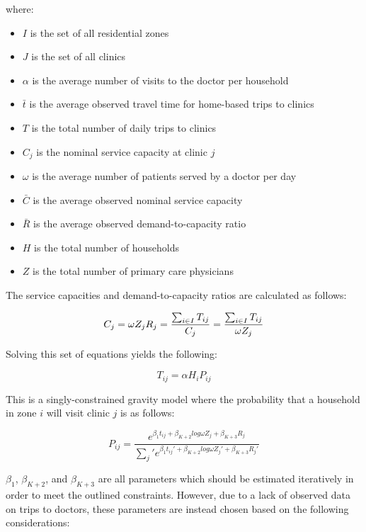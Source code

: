 \documentclass{article}
\begin{document}
where:

\begin{itemize}
\tightlist
\item
  \(I\) is the set of all residential zones
\item
  \(J\) is the set of all clinics
\item
  \(\alpha\) is the average number of visits to the doctor per household
\item
  \(\bar{t}\) is the average observed travel time for home-based trips
  to clinics
\item
  \(T\) is the total number of daily trips to clinics
\item
  \(C_j\) is the nominal service capacity at clinic \(j\)
\item
  \(\omega\) is the average number of patients served by a doctor per
  day
\item
  \(\bar{C}\) is the average observed nominal service capacity
\item
  \(\bar{R}\) is the average observed demand-to-capacity ratio
\item
  \(H\) is the total number of households
\item
  \(Z\) is the total number of primary care physicians
\end{itemize}

The service capacities and demand-to-capacity ratios are calculated as
follows:

\[
C_j = \omega Z_j \\
R_j = \frac{\sum_{i \in I} T_{ij}}{C_j} = \frac{\sum_{i \in I} T_{ij}}{\omega Z_j}
\]

Solving this set of equations yields the following:

\[
T_{ij} = \alpha H_i P_{ij}
\]

This is a singly-constrained gravity model where the probability that a
household in zone \(i\) will visit clinic \(j\) is as follows:

\[
P_{ij} = \frac{e^{\beta_1 t_{ij} + \beta_{K+2} log \omega Z_j + \beta_{K + 3} R_j}}{\sum_j\prime e^{\beta_1 t_{ij}\prime + \beta_{K+2} log \omega Z_j\prime + \beta_{K + 3} R_j\prime}}
\]

\(\beta_1\), \(\beta_{K+2}\), and \(\beta_{K + 3}\) are all parameters
which should be estimated iteratively in order to meet the outlined
constraints. However, due to a lack of observed data on trips to
doctors, these parameters are instead chosen based on the following
considerations:
\end{document}
